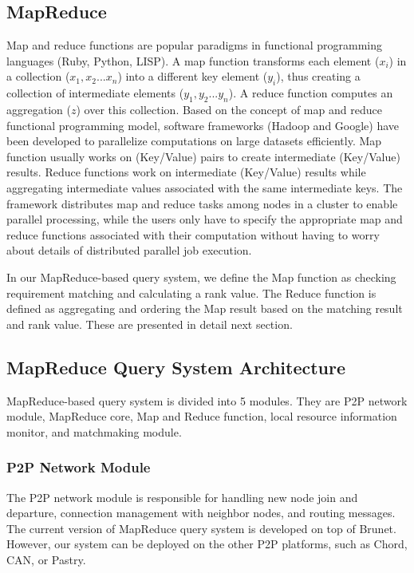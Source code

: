 \documentclass{acm_proc_article-sp}
\begin{document}
\subsection{MapReduce}
Map and reduce functions are popular paradigms in functional programming languages (Ruby, Python, LISP). 
A map function transforms each element ($x_i$) in a collection ({$x_1, x_2... x_n$}) into a different key element ($y_i$), thus creating a collection of intermediate elements ({$y_1, y_2... y_n$}).
A reduce function computes an aggregation ($z$) over this collection. 
Based on the concept of map and reduce functional programming model, software frameworks (Hadoop\cite{hadoop} and Google\cite{google_mapreduce}) have been developed to parallelize computations on large datasets efficiently. 
Map function usually works on (Key/Value) pairs to create intermediate (Key/Value) results. 
Reduce functions work on intermediate (Key/Value) results while aggregating intermediate values associated with the same intermediate keys. 
The framework distributes map and reduce tasks among nodes in a cluster to enable parallel processing, while the users only have to specify the appropriate map and reduce functions associated with their computation without having to worry about details of distributed parallel job execution.  

In our MapReduce-based query system, we define the Map function as checking requirement matching and calculating a rank value. The Reduce function is defined as 
aggregating and ordering the Map result based on the matching result and rank value. These are presented in detail next section.

\subsection{MapReduce Query System Architecture}
MapReduce-based query system is divided into 5 modules. They are P2P network module, MapReduce core, Map and Reduce function, local resource information monitor, and matchmaking module.
\subsubsection{P2P Network Module}
The P2P network module is responsible for handling new node join and departure, connection management with neighbor nodes, and routing messages. 
The current version of MapReduce query system is developed on top of Brunet\cite{brunet}.
However, our system can be deployed on the other P2P platforms, such as Chord\cite{chord}, CAN\cite{can}, or Pastry\cite{pastry}.
\end{document}
